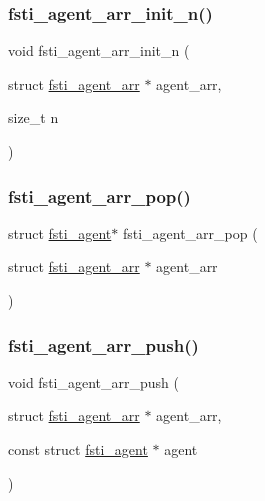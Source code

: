 \mbox{\label{fsti-agent_8c_a2dc08a5f50e57b979f50f6efb927d57c}} 
\subsubsection{\texorpdfstring{fsti\+\_\+agent\+\_\+arr\+\_\+init\+\_\+n()}{fsti\_agent\_arr\_init\_n()}}
{\footnotesize\ttfamily void fsti\+\_\+agent\+\_\+arr\+\_\+init\+\_\+n (\begin{DoxyParamCaption}\item[{struct \mbox{\hyperlink{structfsti__agent__arr}{fsti\+\_\+agent\+\_\+arr}} $\ast$}]{agent\+\_\+arr,  }\item[{size\+\_\+t}]{n }\end{DoxyParamCaption})}

\mbox{\label{fsti-agent_8c_a140245276760c5ca1467b816dfdb16d9}} 
\subsubsection{\texorpdfstring{fsti\+\_\+agent\+\_\+arr\+\_\+pop()}{fsti\_agent\_arr\_pop()}}
{\footnotesize\ttfamily struct \mbox{\hyperlink{structfsti__agent}{fsti\+\_\+agent}}$\ast$ fsti\+\_\+agent\+\_\+arr\+\_\+pop (\begin{DoxyParamCaption}\item[{struct \mbox{\hyperlink{structfsti__agent__arr}{fsti\+\_\+agent\+\_\+arr}} $\ast$}]{agent\+\_\+arr }\end{DoxyParamCaption})}

\mbox{\label{fsti-agent_8c_a0cf9bb69026e48287e83f9d73841f90f}} 
\subsubsection{\texorpdfstring{fsti\+\_\+agent\+\_\+arr\+\_\+push()}{fsti\_agent\_arr\_push()}}
{\footnotesize\ttfamily void fsti\+\_\+agent\+\_\+arr\+\_\+push (\begin{DoxyParamCaption}\item[{struct \mbox{\hyperlink{structfsti__agent__arr}{fsti\+\_\+agent\+\_\+arr}} $\ast$}]{agent\+\_\+arr,  }\item[{const struct \mbox{\hyperlink{structfsti__agent}{fsti\+\_\+agent}} $\ast$}]{agent }\end{DoxyParamCaption})}

